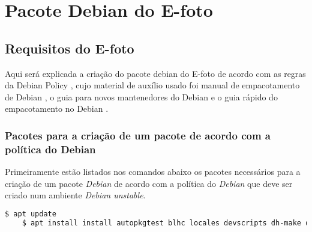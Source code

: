\chapter{Pacote Debian do E-foto}
\section{Requisitos do E-foto}

Aqui será explicada a criação do pacote debian do E-foto de acordo com as regras da Debian Policy \cite{bib:Ian}, cujo material de auxílio usado foi manual de empacotamento de Debian \cite{bib:Lucas}, o guia para novos mantenedores do Debian \cite{bib:Josip} e o guia rápido do empacotamento no Debian \cite{bib:Filho2020}.  

\subsection{Pacotes para a criação de um pacote de acordo com a política do Debian}

Primeiramente estão listados nos comandos abaixo os pacotes necessários para a criação de um pacote \textit{Debian} de acordo com a política do \textit{Debian} que deve ser criado num ambiente \textit{Debian unstable}. 

\begin{lstlisting}[language=bash]
	$ apt update
	$ apt install install autopkgtest blhc locales devscripts dh-make dput-ng git-buildpackage mc quilt spell tardiff tree
\end{lstlisting}

